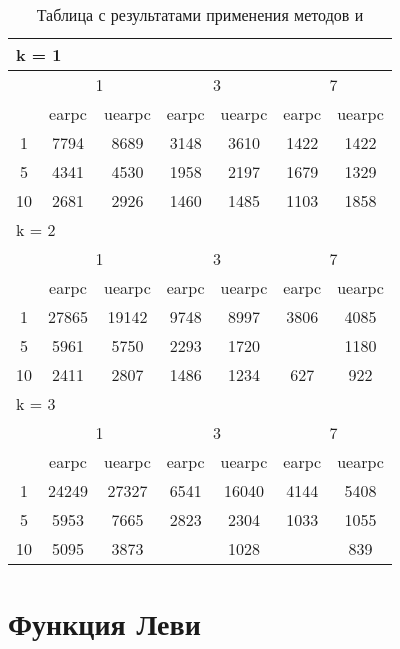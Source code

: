 \begin{table}
  \centering
  \begin{tabular}{|*7{c|}}
    \hline
    \multicolumn{7}{|l|}{k = 1} \\
    \hline
    \multirow{2}{*}{\diagbox{$\mu$}{$\lambda$}} & \multicolumn{2}{c|}{1} & \multicolumn{2}{c|}{3} & \multicolumn{2}{c|}{7} \\
    \cline{2-7}
    & earpc & uearpc & earpc & uearpc & earpc & uearpc \\
    \hline
    1 & 7794 & 8689 & 3148 & 3610 & 1422 & 1422 \\
    \hline
    5 & 4341 & 4530 & 1958 & 2197 & 1679 & 1329 \\
    \hline
    10 & 2681 & 2926 & 1460 & 1485 & 1103 & 1858 \\
    \hline
    \multicolumn{7}{|l|}{k = 2} \\
    \hline
    \multirow{2}{*}{\diagbox{$\mu$}{$\lambda$}} & \multicolumn{2}{c|}{1} & \multicolumn{2}{c|}{3} & \multicolumn{2}{c|}{7} \\
    \cline{2-7}
    & earpc & uearpc & earpc & uearpc & earpc & uearpc \\
    \hline
    1 & 27865 & 19142 & 9748 & 8997 & 3806 & 4085 \\
    \hline
    5 & 5961 & 5750 & 2293 & 1720& \cellcolor{olive}{933} & 1180 \\
    \hline
    10 & 2411 & 2807 & 1486 & 1234 & 627 & 922 \\
    \hline
    \multicolumn{7}{|l|}{k = 3} \\
    \hline
    \multirow{2}{*}{\diagbox{$\mu$}{$\lambda$}} & \multicolumn{2}{c|}{1} & \multicolumn{2}{c|}{3} & \multicolumn{2}{c|}{7} \\
    \cline{2-7}
    & earpc & uearpc & earpc & uearpc & earpc & uearpc \\
    \hline
    1 & 24249 & 27327 & 6541 & 16040 & 4144 & 5408 \\
    \hline
    5 & 5953 & 7665 & 2823& 2304 & 1033 & 1055 \\
    \hline
    10 & 5095 & 3873& \cellcolor{olive}{1013} & 1028& \cellcolor{olive}{779} & 839 \\
    \hline
  \end{tabular}
  \captionsetup{justification=centering}
  \caption{Таблица с результатами применения методов  и }
\end{table}

\section{Функция Леви}

